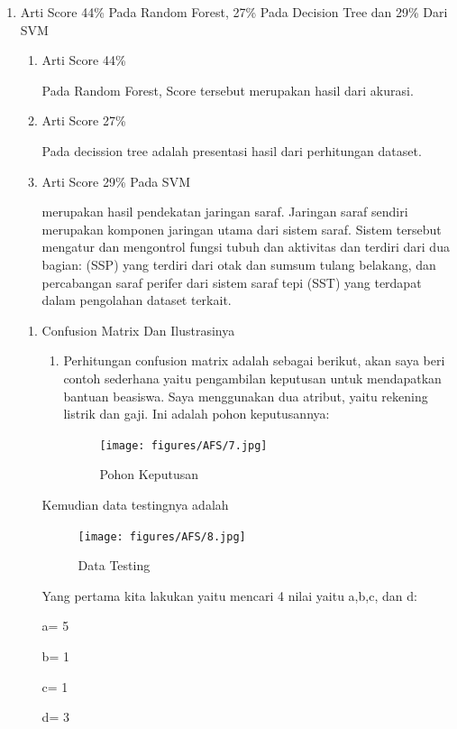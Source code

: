 \begin{enumerate}
\item Arti Score 44\% Pada Random Forest, 27\% Pada Decision Tree dan 29\% Dari SVM \par
\begin{enumerate}
\item Arti Score 44\% \par
Pada Random Forest, Score tersebut merupakan hasil dari akurasi.
\item Arti Score 27\% \par
Pada decission tree adalah presentasi hasil dari perhitungan dataset.
\item Arti Score 29\% Pada SVM \par
merupakan hasil pendekatan jaringan saraf. Jaringan saraf sendiri merupakan komponen jaringan utama dari sistem saraf. Sistem tersebut mengatur dan mengontrol fungsi tubuh dan aktivitas dan terdiri dari dua bagian:  (SSP) yang terdiri dari otak dan sumsum tulang belakang, dan percabangan saraf perifer dari sistem saraf tepi (SST) yang terdapat dalam pengolahan dataset terkait. 
\end{enumerate}

\begin {enumerate}
\item Confusion Matrix Dan Ilustrasinya
\begin{enumerate}
\item Perhitungan confusion matrix adalah sebagai berikut, akan saya beri contoh sederhana yaitu pengambilan keputusan untuk mendapatkan bantuan beasiswa. Saya menggunakan dua atribut, yaitu rekening listrik dan gaji. Ini adalah pohon keputusannya:
 
\begin{figure}[ht]
\centering
\texttt{[image: figures/AFS/7.jpg]}
\caption{Pohon Keputusan}
\label{contoh}
\end{figure}
\end{enumerate}


Kemudian data testingnya adalah

\begin{figure}[ht]
\centering
\texttt{[image: figures/AFS/8.jpg]}
\caption{Data Testing}
\label{contoh}
\end{figure}

Yang pertama kita lakukan yaitu mencari 4 nilai yaitu a,b,c, dan d:

 a= 5

 b= 1

 c= 1

 d= 3


\end{enumerate}
\end{enumerate}
